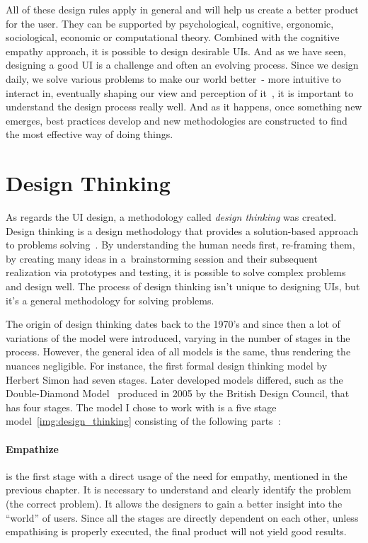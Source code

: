 All of these design rules apply in general and will help us create a better product for the user. They can be supported by psychological, cognitive, ergonomic, sociological, economic or computational theory. Combined with the cognitive empathy approach, it is possible to design desirable UIs. And as we have seen, designing a good UI is a challenge and often an evolving process. Since we design daily, we solve various problems to make our world better~- more intuitive to interact in, eventually shaping our view and perception of it~\cite{Norman}, it is important to understand the design process really well. And as it happens, once something new emerges, best practices develop and new methodologies are constructed to find the most effective way of doing things.

\section{Design Thinking}
As regards the UI design, a methodology called \textit{design thinking} was created. Design thinking is a design methodology that provides a solution-based approach to problems solving~\cite{InteractionDesign}. By understanding the human needs first, re-framing them, by creating many ideas in a~brainstorming session and their subsequent realization via prototypes and testing, it is possible to solve complex problems and design well. The process of design thinking isn’t unique to designing UIs, but it’s a general methodology for solving problems.

The origin of design thinking dates back to the 1970’s and since then a lot of variations of the model were introduced, varying in the number of stages in the process. However, the general idea of all models is the same, thus rendering the nuances negligible. For instance, the first formal design thinking model by Herbert Simon had seven stages. Later developed models differed, such as the Double-Diamond Model~\cite{DoubleDiamond} produced in 2005 by the British Design Council, that has four stages. The model I chose to work with is a five stage model~\ref{img:design_thinking} consisting of the following parts~\cite{InteractionDesign}:


\paragraph{Empathize}
is the first stage with a direct usage of the need for empathy, mentioned in the previous chapter. It is necessary to understand and clearly identify the problem (the correct problem). It allows the designers to gain a better insight into the “world” of users. Since all the stages are directly dependent on each other, unless empathising is properly executed, the final product will not yield good results.

